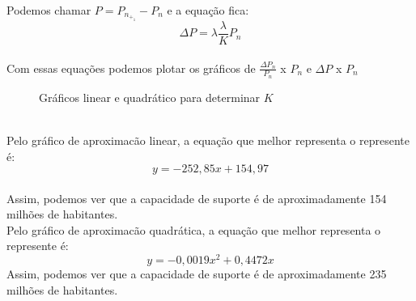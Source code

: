\documentclass[a4paper]{article}
\begin{document}
\\
Podemos chamar \Delta $P = P_n_+_1 - P_n$ e a equa\c{c}\~{a}o fica:
\begin{equation}
\Delta P = \lambda  \frac{\lambda}{K}P_n
\end{equation}
\\
Com essas equa\c{c}\~{o}es podemos plotar os gr\'{a}ficos de $\frac{\Delta P_n}{P_n}$ x $P_n$ e $\Delta P$ x $P_n$
\\
\begin{figure}[h]
\label{grafLinear}
\caption{Gr\'{a}ficos linear e quadr\'{a}tico para determinar $K$}
{}
\end{figure}
\\
Pelo gr\'{a}fico de aproximac\~{a}o linear, a equa\c{c}\~{a}o que melhor representa o represente \'{e}:
\begin{equation}
y = -252,85x +154,97
\end{equation}
\\
Assim, podemos ver que a capacidade de suporte \'{e} de aproximadamente 154 milh\~{o}es de habitantes.
\\
Pelo gr\'{a}fico de aproximac\~{a}o quadr\'{a}tica, a equa\c{c}\~{a}o que melhor representa o represente \'{e}:
\begin{equation}
y = - 0,0019x^2 + 0,4472x
\end{equation}
Assim, podemos ver que a capacidade de suporte \'{e} de aproximadamente 235 milh\~{o}es de habitantes.
\\
\end{document}
